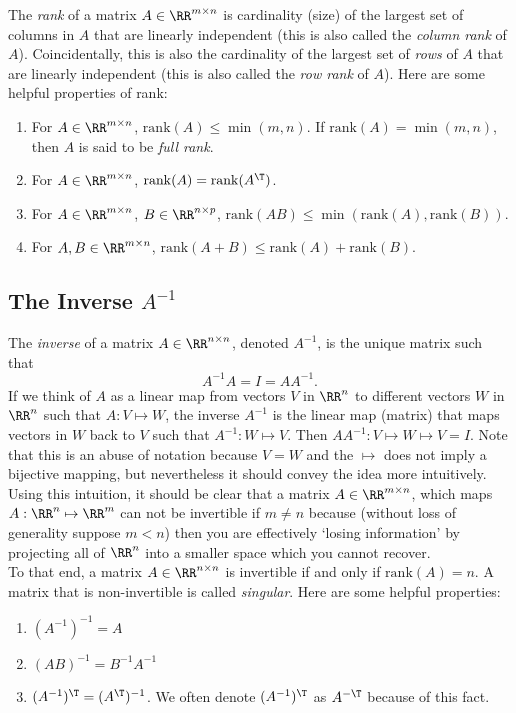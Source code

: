 \documentclass{article}
\newcommand{\rank}{\mathrm{rank}}
\begin{document}
The \textit{rank} of a matrix $A\in\RR^{m\times n}$ is cardinality (size) of the largest set of
columns in $A$ that are linearly independent (this is also called the \textit{column rank} of $A$).
Coincidentally, this is also the cardinality of the largest set of \textit{rows} of $A$ that are 
linearly independent (this is also called the \textit{row rank} of $A$). Here are some helpful
properties of rank:
\begin{enumerate}
\item For $A\in\RR^{m\times n}$, $\rank(A)\leq\min(m,n)$. If $\rank(A)=\min(m,n)$, then $A$
    is said to be \textit{full rank}.
\item For $A\in\RR^{m\times n}$, $\rank(A) = \rank(A^\T)$.
\item For $A\in\RR^{m\times n}$, $B\in\RR^{n\times p}$, $\rank(AB)\leq \min(\rank(A),\rank(B))$.
\item For $A,B\in\RR^{m\times n}$, $\rank(A+B)\leq \rank(A) + \rank(B)$.
\end{enumerate}

\subsection{The Inverse $A^{-1}$}

The \textit{inverse} of a matrix $A\in\RR^{n\times n}$, denoted $A^{-1}$, is the unique matrix
such that
\[
    A^{-1}A = I = AA^{-1}.
\]
If we think of $A$ as a linear map from vectors $V$ in $\RR^n$ to different vectors $W$ in $\RR^n$
such that $A : V \mapsto W$, the inverse $A^{-1}$ is the linear map (matrix) that maps vectors in
$W$ back to $V$ such that $A^{-1}: W \mapsto V$. Then $AA^{-1}:V\mapsto W\mapsto V = I$.
Note that this is an abuse of notation because
$V=W$ and the $\mapsto$ does not imply a bijective mapping, but nevertheless it should convey the
idea more intuitively.\\

Using this intuition, it should be clear that a matrix $A\in\RR^{m\times n}$, which maps $A: \RR^n
\mapsto \RR^m$ can not be invertible if $m\neq n$ because (without loss of generality suppose $m < n$)
then you are effectively `losing information' by projecting all of $\RR^n$ into a smaller space which
you cannot recover.\\

To that end, a matrix $A\in\RR^{n\times n}$ is invertible if and only if $\rank(A) = n$. A matrix that
is non-invertible is called \textit{singular}. Here are some helpful properties:
\begin{enumerate}
\item $(A^{-1})^{-1} = A$
\item $(AB)^{-1} = B^{-1}A^{-1}$
\item $(A^{-1})^\T = (A^\T)^{-1}$. We often denote $(A^{-1})^\T$ as $A^{-\T}$ because
    of this fact.\\
\end{enumerate}
\end{document}
